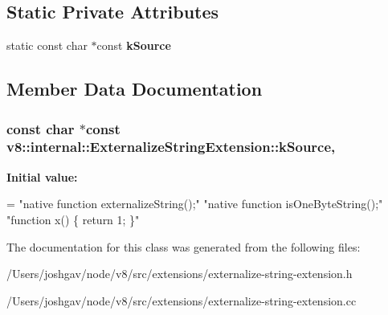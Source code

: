 \subsection*{Static Private Attributes}
\begin{DoxyCompactItemize}
\item 
static const char $\ast$const {\bfseries k\+Source}
\end{DoxyCompactItemize}


\subsection{Member Data Documentation}
\subsubsection[{\texorpdfstring{k\+Source}{kSource}}]{\setlength{\rightskip}{0pt plus 5cm}const char $\ast$const v8\+::internal\+::\+Externalize\+String\+Extension\+::k\+Source\hspace{0.3cm}{\ttfamily [static]}, {\ttfamily [private]}}\hypertarget{classv8_1_1internal_1_1_externalize_string_extension_a65ac5ad041e38fce3ecab51ee56e1baa}{}\label{classv8_1_1internal_1_1_externalize_string_extension_a65ac5ad041e38fce3ecab51ee56e1baa}
{\bfseries Initial value\+:}
\begin{DoxyCode}
=
    \textcolor{stringliteral}{"native function externalizeString();"}
    \textcolor{stringliteral}{"native function isOneByteString();"}
    \textcolor{stringliteral}{"function x() \{ return 1; \}"}
\end{DoxyCode}


The documentation for this class was generated from the following files\+:\begin{DoxyCompactItemize}
\item 
/\+Users/joshgav/node/v8/src/extensions/externalize-\/string-\/extension.\+h\item 
/\+Users/joshgav/node/v8/src/extensions/externalize-\/string-\/extension.\+cc\end{DoxyCompactItemize}
